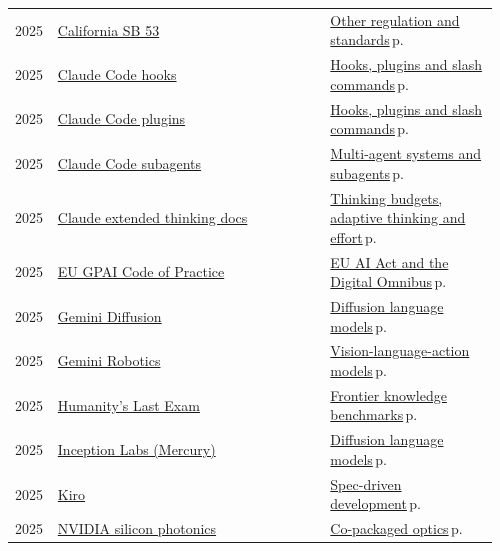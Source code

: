 \documentclass[10pt,a4paper,openany]{report}
\begin{document}
{\begin{longtable}{@{}p{0.07\linewidth}>{\raggedright}p{0.55\linewidth}>{\raggedright\arraybackslash}p{0.34\linewidth}@{}}
2025 & \href{https://leginfo.legislature.ca.gov/faces/billNavClient.xhtml?bill_id=202520260SB53}{California SB 53} & \hyperref[c:safety-12]{Other regulation and standards}\,{\color{muted}\scriptsize p.\,\pageref{c:safety-12}}\\
2025 & \href{https://docs.claude.com/en/docs/claude-code/hooks}{Claude Code hooks} & \hyperref[c:coding-5]{Hooks, plugins and slash commands}\,{\color{muted}\scriptsize p.\,\pageref{c:coding-5}}\\
2025 & \href{https://docs.claude.com/en/docs/claude-code/plugins}{Claude Code plugins} & \hyperref[c:coding-5]{Hooks, plugins and slash commands}\,{\color{muted}\scriptsize p.\,\pageref{c:coding-5}}\\
2025 & \href{https://docs.claude.com/en/docs/claude-code/sub-agents}{Claude Code subagents} & \hyperref[c:agents-7]{Multi-agent systems and subagents}\,{\color{muted}\scriptsize p.\,\pageref{c:agents-7}}\\
2025 & \href{https://docs.claude.com/en/docs/build-with-claude/extended-thinking}{Claude extended thinking docs} & \hyperref[c:reasoning-1]{Thinking budgets, adaptive thinking and effort}\,{\color{muted}\scriptsize p.\,\pageref{c:reasoning-1}}\\
2025 & \href{https://digital-strategy.ec.europa.eu/en/policies/contents-code-gpai}{EU GPAI Code of Practice} & \hyperref[c:safety-11]{EU AI Act and the Digital Omnibus}\,{\color{muted}\scriptsize p.\,\pageref{c:safety-11}}\\
2025 & \href{https://deepmind.google/models/gemini-diffusion/}{Gemini Diffusion} & \hyperref[c:arch-5]{Diffusion language models}\,{\color{muted}\scriptsize p.\,\pageref{c:arch-5}}\\
2025 & \href{https://deepmind.google/models/gemini-robotics/}{Gemini Robotics} & \hyperref[c:embodied-0]{Vision-language-action models}\,{\color{muted}\scriptsize p.\,\pageref{c:embodied-0}}\\
2025 & \href{https://lastexam.ai}{Humanity's Last Exam} & \hyperref[c:evals-6]{Frontier knowledge benchmarks}\,{\color{muted}\scriptsize p.\,\pageref{c:evals-6}}\\
2025 & \href{https://www.inceptionlabs.ai}{Inception Labs (Mercury)} & \hyperref[c:arch-5]{Diffusion language models}\,{\color{muted}\scriptsize p.\,\pageref{c:arch-5}}\\
2025 & \href{https://kiro.dev}{Kiro} & \hyperref[c:coding-3]{Spec-driven development}\,{\color{muted}\scriptsize p.\,\pageref{c:coding-3}}\\
2025 & \href{https://www.nvidia.com/en-us/networking/products/silicon-photonics/}{NVIDIA silicon photonics} & \hyperref[c:hardware-10]{Co-packaged optics}\,{\color{muted}\scriptsize p.\,\pageref{c:hardware-10}}\\

\end{longtable}}
\end{document}
